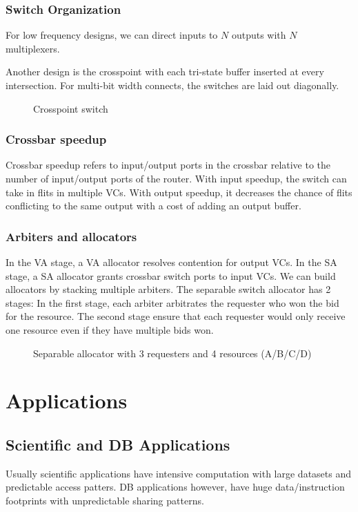 \documentclass{article}
\begin{document}
\begin{multicols*}{2}
\subsubsection{Switch Organization}
For low frequency designs, we can direct inputs to $N$ outputs with $N$ multiplexers.

\noindent\newline
Another design is the crosspoint with each tri-state buffer inserted at every intersection. For multi-bit width connects, the switches are laid out diagonally.
\begin{figure}[H]
    \caption{Crosspoint switch}
\end{figure}  

\subsubsection{Crossbar speedup}
Crossbar speedup refers to input/output ports in the crossbar relative to the number of input/output ports of the router. With input speedup, the switch can take in flits in multiple VCs. With output speedup, it decreases the chance of flits conflicting to the same output with a cost of adding an output buffer.

\subsubsection{Arbiters and allocators}
In the VA stage, a VA allocator resolves contention for output VCs. In the SA stage, a SA allocator grants crossbar switch ports to input VCs. We can build allocators by stacking multiple arbiters. 
\medskip\noindent\newline
The separable switch allocator has 2 stages: In the first stage, each arbiter arbitrates the requester who won the bid for the resource. The second stage ensure that each requester would only receive one resource even if they have multiple bids won.
\begin{figure}[H]
    \caption{Separable allocator with 3 requesters and 4 resources (A/B/C/D)}
\end{figure}  

\section{Applications}

\subsection{Scientific and DB Applications}
Usually scientific applications have intensive computation with large datasets and predictable access patters. DB applications however, have huge data/instruction footprints with unpredictable sharing patterns.


\end{multicols*}
\end{document}
